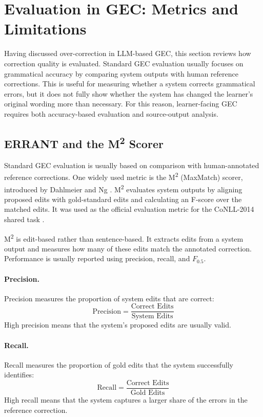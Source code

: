 \section{Evaluation in GEC: Metrics and Limitations}

Having discussed over-correction in LLM-based GEC, this section reviews how correction quality is evaluated. Standard GEC evaluation usually focuses on grammatical accuracy by comparing system outputs with human reference corrections. This is useful for measuring whether a system corrects grammatical errors, but it does not fully show whether the system has changed the learner's original wording more than necessary. For this reason, learner-facing GEC requires both accuracy-based evaluation and source-output analysis.

\subsection{ERRANT and the M\textsuperscript{2} Scorer}

Standard GEC evaluation is usually based on comparison with human-annotated reference corrections. One widely used metric is the M\textsuperscript{2} (MaxMatch) scorer, introduced by Dahlmeier and Ng \cite{dahlmeier-ng-2012-better}. M\textsuperscript{2} evaluates system outputs by aligning proposed edits with gold-standard edits and calculating an F-score over the matched edits. It was used as the official evaluation metric for the CoNLL-2014 shared task \cite{ng-etal-2014-conll}.

M\textsuperscript{2} is edit-based rather than sentence-based. It extracts edits from a system output and measures how many of these edits match the annotated correction. Performance is usually reported using precision, recall, and $F_{0.5}$.

\paragraph{Precision.}
Precision measures the proportion of system edits that are correct:
\[
\text{Precision} = \frac{\text{Correct Edits}}{\text{System Edits}}
\]
High precision means that the system's proposed edits are usually valid.

\paragraph{Recall.}
Recall measures the proportion of gold edits that the system successfully identifies:
\[
\text{Recall} = \frac{\text{Correct Edits}}{\text{Gold Edits}}
\]
High recall means that the system captures a larger share of the errors in the reference correction.

